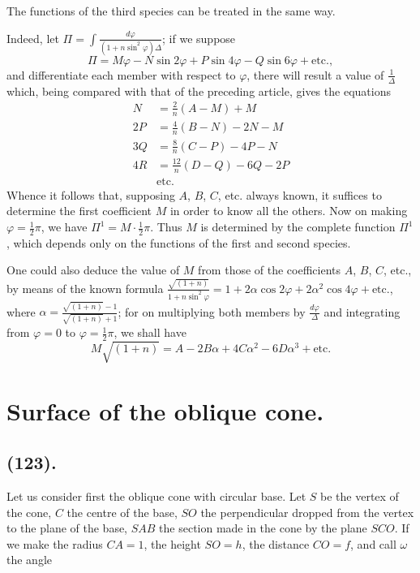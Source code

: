 \documentclass{article}
\begin{document}
The functions of the third species can be treated in the same way.

Indeed, let $\Pi=\displaystyle\int\frac{d\varphi}{(1+n\sin^{2}\varphi)\Delta}$; if we suppose
\[ \Pi=M\varphi-N\sin2\varphi+P\sin4\varphi-Q\sin6\varphi+\text{etc.}, \]
and differentiate each member with respect to $\varphi$, there will result a value of $\frac{1}{\Delta}$ which, being compared with that of the preceding article, gives the equations
\[ \begin{aligned} N&=\frac{2}{n}(A-M)+M\\ 2P&=\frac{4}{n}(B-N)-2N-M\\ 3Q&=\frac{8}{n}(C-P)-4P-N\\ 4R&=\frac{12}{n}(D-Q)-6Q-2P\\ &\text{etc.} \end{aligned} \]
Whence it follows that, supposing $A$, $B$, $C$, etc. always known, it suffices to determine the first coefficient $M$ in order to know all the others. Now on making $\varphi=\frac{1}{2}\pi$, we have $\Pi^{1}=M\cdot\frac{1}{2}\pi$. Thus $M$ is determined by the complete function $\Pi^{1}$, which depends only on the functions of the first and second species.

One could also deduce the value of $M$ from those of the coefficients $A$, $B$, $C$, etc., by means of the known formula $\frac{\sqrt{(1+n)}}{1+n\sin^{2}\varphi}=1+2\alpha\cos2\varphi+2\alpha^{2}\cos4\varphi+\text{etc.}$, where $\alpha=\frac{\sqrt{(1+n)}-1}{\sqrt{(1+n)}+1}$; for on multiplying both members by $\frac{d\varphi}{\Delta}$ and integrating from $\varphi=0$ to $\varphi=\frac{1}{2}\pi$, we shall have
\[ M\sqrt{(1+n)}=A-2B\alpha+4C\alpha^{2}-6D\alpha^{3}+\text{etc.} \]

\section*{Surface of the oblique cone.}

\subsection*{(123).}


Let us consider first the oblique cone with circular base. Let $S$ be the vertex of the cone, $C$ the centre of the base, $SO$ the perpendicular dropped from the vertex to the plane of the base, $SAB$ the section made in the cone by the plane $SCO$. If we make the radius $CA=1$, the height $SO=h$, the distance $CO=f$, and call $\omega$ the angle
\end{document}
